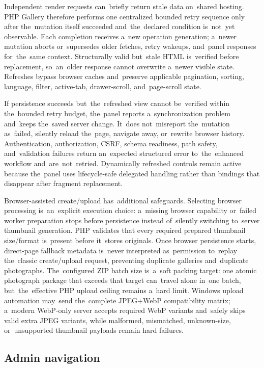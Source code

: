 \documentclass[11pt,a4paper]{article}
\begin{document}
Independent render requests can~briefly return stale data on~shared hosting. PHP
Gallery therefore performs one centralized bounded retry sequence only after
the~mutation itself succeeded and~the~declared condition is~not~yet observable.
Each completion receives a~new operation generation; a~newer mutation aborts
or~supersedes older fetches, retry wakeups, and~panel responses for~the~same
context. Structurally valid but~stale HTML is~verified before replacement,
so~an~older response cannot overwrite a~newer visible state. Refreshes bypass
browser caches and~preserve applicable pagination, sorting, language, filter,
active-tab, drawer-scroll, and~page-scroll state.

If persistence succeeds but~the~refreshed view cannot be~verified within
the~bounded retry budget, the~panel reports a~synchronization problem and~keeps
the~saved server change. It~does not~misreport the~mutation as~failed, silently
reload the~page, navigate away, or~rewrite browser history. Authentication,
authorization, CSRF, schema readiness, path safety, and~validation failures
return an~expected structured error to~the~enhanced workflow
and~are~not~retried. Dynamically refreshed controls remain active because
the~panel uses lifecycle-safe delegated handling rather than bindings that
disappear after fragment replacement.

Browser-assisted create/upload has~additional safeguards. Selecting browser
processing is~an~explicit execution choice: a~missing browser capability
or~failed worker preparation stops before persistence instead of~silently
switching to~server thumbnail generation. PHP validates that every required
prepared thumbnail size/format is~present before it~stores originals. Once
browser persistence starts, direct-page fallback metadata is~never interpreted
as~permission to~replay the~classic create/upload request, preventing duplicate
galleries and~duplicate photographs. The~configured ZIP batch size is~a~soft
packing target: one atomic photograph package that exceeds that target
can~travel alone in~one batch, but~the~effective PHP upload ceiling remains
a~hard limit. Windows upload automation may~send the~complete JPEG+WebP
compatibility matrix; a~modern WebP-only server accepts required WebP variants
and~safely skips valid extra JPEG variants, while malformed, mismatched,
unknown-size, or~unsupported thumbnail payloads remain hard failures.

\subsection{Admin navigation}
\end{document}
